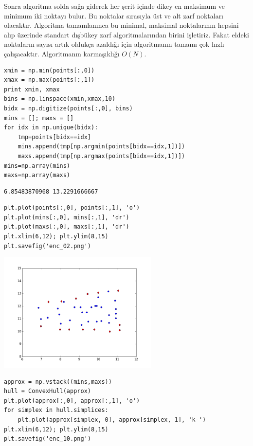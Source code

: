 \documentclass[12pt,fleqn]{article}\usepackage{../../common}
\begin{document}
Sonra algoritma solda sağa giderek her şerit içinde dikey en maksimum ve
minimum iki noktayı bulur. Bu noktalar sırasıyla üst ve alt zarf noktaları
olacaktır. Algoritma tamamlanınca bu minimal, maksimal noktalarının hepsini
alıp üzerinde standart dışbükey zarf algoritmalarından birini
işletiriz. Fakat eldeki noktaların sayısı artık oldukça azaldığı için
algoritmanın tamamı çok hızlı çalışacaktır. Algoritmanın karmaşıklığı
$O(N)$.

\begin{verbatim}
xmin = np.min(points[:,0])
xmax = np.max(points[:,1])
print xmin, xmax
bins = np.linspace(xmin,xmax,10)
bidx = np.digitize(points[:,0], bins)
mins = []; maxs = []
for idx in np.unique(bidx):
    tmp=points[bidx==idx]
    mins.append(tmp[np.argmin(points[bidx==idx,1])])
    maxs.append(tmp[np.argmax(points[bidx==idx,1])])
mins=np.array(mins)
maxs=np.array(maxs)
\end{verbatim}

\begin{verbatim}
6.85483870968 13.2291666667
\end{verbatim}

\begin{verbatim}
plt.plot(points[:,0], points[:,1], 'o')
plt.plot(mins[:,0], mins[:,1], 'dr')
plt.plot(maxs[:,0], maxs[:,1], 'dr')
plt.xlim(6,12); plt.ylim(8,15)
plt.savefig('enc_02.png')
\end{verbatim}

\includegraphics[height=6cm]{enc_02.png}

\begin{verbatim}
approx = np.vstack((mins,maxs))
hull = ConvexHull(approx)
plt.plot(approx[:,0], approx[:,1], 'o')
for simplex in hull.simplices:
    plt.plot(approx[simplex, 0], approx[simplex, 1], 'k-')
plt.xlim(6,12); plt.ylim(8,15)
plt.savefig('enc_10.png')
\end{verbatim}
\end{document}
